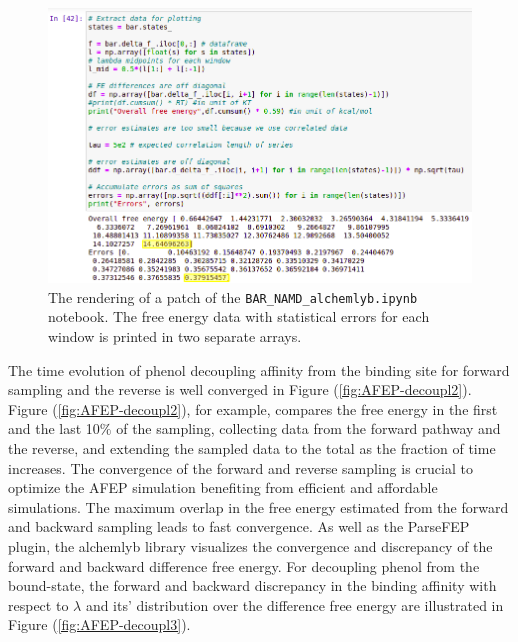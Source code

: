 \documentclass[9pt,tutorial]{livecoms}
\begin{document}
\begin{figure}[h!]
\centering
\includegraphics[width=0.9\linewidth]{ipynb-cell4.png}
\caption{The rendering of a patch of the \texttt{BAR\_NAMD\_alchemlyb.ipynb} notebook. The free energy data with statistical errors for each window is printed in two separate arrays.}\label{fig:ipynb-cell4}
\end{figure}
The time evolution of phenol decoupling affinity from the binding site for forward sampling and the reverse is well converged in Figure (\ref{fig:AFEP-decoupl2}). Figure (\ref{fig:AFEP-decoupl2}), for example, compares the free energy in the first and the last 10{$\%$} of the sampling, collecting data from the forward pathway and the reverse, and extending the sampled data to the total as the fraction of time increases. The convergence of the forward and reverse sampling is crucial to optimize the AFEP simulation benefiting from efficient and affordable simulations. The maximum overlap in the free energy estimated from the forward and backward sampling leads to fast convergence. As well as the ParseFEP plugin, the alchemlyb library visualizes the convergence and discrepancy of the forward and backward difference free energy. For decoupling phenol from the bound-state, the forward and backward discrepancy in the binding affinity with respect to {$\lambda$} and its' distribution over the difference free energy are illustrated in Figure (\ref{fig:AFEP-decoupl3}).
\end{document}
